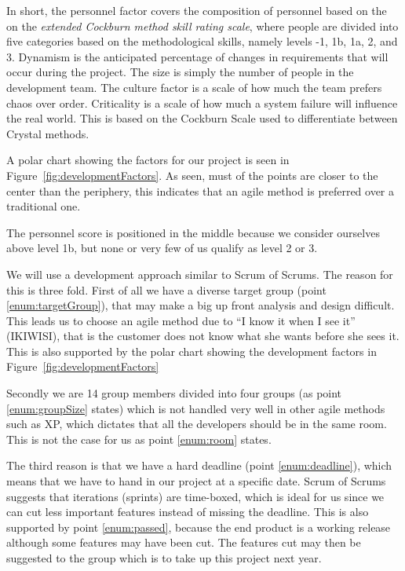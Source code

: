 In short, the personnel factor covers the composition of personnel based on the on the \textit{extended Cockburn method skill rating scale}, where people are divided into five categories based on the methodological skills, namely levels -1, 1b, 1a, 2, and 3.
Dynamism is the anticipated percentage of changes in requirements that will occur during the project.
The size is simply the number of people in the development team.
The culture factor is a scale of how much the team prefers chaos over order.
Criticality is a scale of how much a system failure will influence the real world.
This is based on the Cockburn Scale used to differentiate between Crystal methods.

A polar chart showing the factors for our project is seen in Figure~\ref{fig:developmentFactors}.
As seen, must of the points are closer to the center than the periphery, this indicates that an agile method is preferred over a traditional one.

The personnel score is positioned in the middle because we consider ourselves above level 1b, but none or very few of us qualify as level 2 or 3.


We will use a development approach similar to Scrum of Scrums.
The reason for this is three fold.
First of all we have a diverse target group (point \ref{enum:targetGroup}), that may make a big up front analysis and design difficult.
This leads us to choose an agile method due to ``I know it when I see it'' (IKIWISI), that is the customer does not know what she wants before she sees it.
This is also supported by the polar chart showing the development factors in Figure~\ref{fig:developmentFactors}

Secondly we are 14 group members divided into four groups (as point \ref{enum:groupSize} states) which is not handled very well in other agile methods such as XP, which dictates that all the developers should be in the same room. 
This is not the case for us as point \ref{enum:room} states.

The third reason is that we have a hard deadline (point \ref{enum:deadline}), which means that we have to hand in our project at a specific date.
Scrum of Scrums suggests that iterations (sprints) are time-boxed, which is ideal for us since we can cut less important features instead of missing the deadline.
This is also supported by point \ref{enum:passed}, because the end product is a working release although some features may have been cut.
The features cut may then be suggested to the group which is to take up this project next year.



